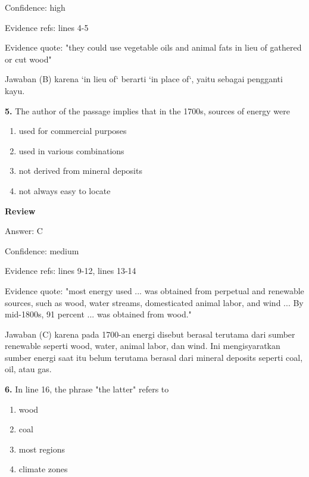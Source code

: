 \documentclass[12pt]{article}
\begin{document}
Confidence: high\par
Evidence refs: lines 4-5\par
Evidence quote: "they could use vegetable oils and animal fats in lieu of gathered or cut wood"\par
Jawaban (B) karena `in lieu of` berarti `in place of`, yaitu sebagai pengganti kayu.\par
\endgroup
\par
\vspace{0.25\baselineskip}
\noindent\textbf{5.} The author of the passage implies that in the 1700s, sources of energy were
\begin{enumerate}[label=(\Alph*),leftmargin=*,itemsep=0.2em]
\item used for commercial purposes
\item used in various combinations
\item not derived from mineral deposits
\item not always easy to locate
\end{enumerate}
\par
\begingroup
\setlength{\parskip}{0pt}
\setlength{\parindent}{0pt}
\textbf{Review}\par
Answer: C\par
Confidence: medium\par
Evidence refs: lines 9-12, lines 13-14\par
Evidence quote: "most energy used ... was obtained from perpetual and renewable sources, such as wood, water streams, domesticated animal labor, and wind ... By mid-1800s, 91 percent ... was obtained from wood."\par
Jawaban (C) karena pada 1700-an energi disebut berasal terutama dari sumber renewable seperti wood, water, animal labor, dan wind. Ini mengisyaratkan sumber energi saat itu belum terutama berasal dari mineral deposits seperti coal, oil, atau gas.\par
\endgroup
\par
\vspace{0.25\baselineskip}
\noindent\textbf{6.} In line 16, the phrase "the latter" refers to
\begin{enumerate}[label=(\Alph*),leftmargin=*,itemsep=0.2em]
\item wood
\item coal
\item most regions
\item climate zones
\end{enumerate}
\par
\end{document}
